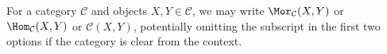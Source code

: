 For a category $\mathcal{C}$ and objects $X,Y \in \mathcal{C}$, we may write $\Mor_\mathcal{C}(X,Y)$ or $\Hom_\mathcal{C}(X,Y)$ or $\mathcal{C}(X,Y)$, potentially omitting the subscript in the first two options if the category is clear from the context. 